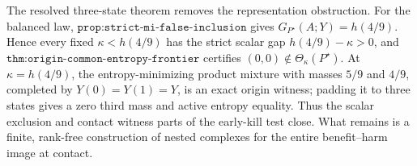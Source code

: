 The resolved three-state theorem removes the representation obstruction.  For the balanced law, \(\texttt{prop:strict-mi-false-inclusion}\) gives \(G_{P^\star}(A;Y)=h(4/9)\).  Hence every fixed \(\kappa<h(4/9)\) has the strict scalar gap \(h(4/9)-\kappa>0\), and \(\texttt{thm:origin-common-entropy-frontier}\) certifies \((0,0)\notin\Theta_\kappa(P^\star)\).  At \(\kappa=h(4/9)\), the entropy-minimizing product mixture with masses \(5/9\) and \(4/9\), completed by \(Y(0)=Y(1)=Y\), is an exact origin witness; padding it to three states gives a zero third mass and active entropy equality.  Thus the scalar exclusion and contact witness parts of the early-kill test close.  What remains is a finite, rank-free construction of nested complexes for the entire benefit--harm image at contact.